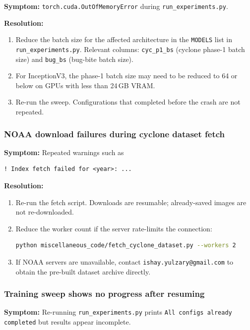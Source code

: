 \documentclass[12pt,a4paper]{article}
\begin{document}
\textbf{Symptom:} \texttt{torch.cuda.OutOfMemoryError} during
\texttt{run\_experiments.py}.

\textbf{Resolution:}
\begin{enumerate}
    \item Reduce the batch size for the affected architecture in the
          \texttt{MODELS} list in \texttt{run\_experiments.py}.
          Relevant columns: \texttt{cyc\_p1\_bs} (cyclone phase-1 batch
          size) and \texttt{bug\_bs} (bug-bite batch size).
    \item For InceptionV3, the phase-1 batch size may need to be reduced
          to 64 or below on GPUs with less than 24\,GB VRAM.
    \item Re-run the sweep. Configurations that completed before the
          crash are not repeated.
\end{enumerate}

\subsubsection{NOAA download failures during cyclone dataset fetch}

\textbf{Symptom:} Repeated warnings such as
\begin{lstlisting}
! Index fetch failed for <year>: ...
\end{lstlisting}

\textbf{Resolution:}
\begin{enumerate}
    \item Re-run the fetch script. Downloads are resumable; already-saved
          images are not re-downloaded.
    \item Reduce the worker count if the server rate-limits the connection:
\begin{lstlisting}[language=bash]
python miscellaneous_code/fetch_cyclone_dataset.py --workers 2
\end{lstlisting}
    \item If NOAA servers are unavailable, contact
          \texttt{ishay.yulzary@gmail.com} to obtain the pre-built dataset
          archive directly.
\end{enumerate}

\subsubsection{Training sweep shows no progress after resuming}

\textbf{Symptom:} Re-running \texttt{run\_experiments.py} prints
\texttt{All configs already completed} but results appear incomplete.
\end{document}
